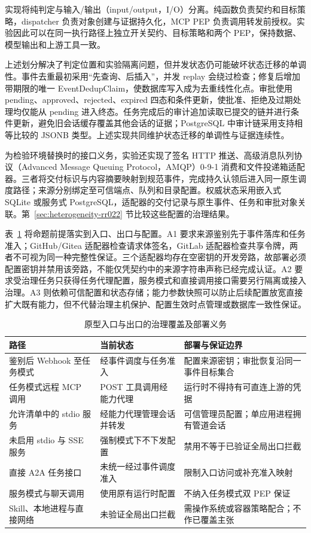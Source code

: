 实现将纯判定与输入/输出（input/output，I/O）分离。纯函数负责契约和目标策略，dispatcher 负责对象创建与证据持久化，MCP PEP 负责调用转发前授权。实验因此可以在同一执行路径上独立开关契约、目标策略和两个 PEP，保持数据、模型输出和上游工具一致。

上述划分解决了判定位置和实验隔离问题，但并发状态仍可能破坏状态迁移的单调性。事件去重最初采用“先查询、后插入”，并发 replay 会绕过检查；修复后增加带期限的唯一 EventDedupClaim，使数据库写入成为去重线性化点。审批使用 pending、approved、rejected、expired 四态和条件更新，使批准、拒绝及过期处理均仅能从 pending 进入终态。任务完成后的审计追加读取已提交的链并进行条件更新，避免旧会话缓存覆盖其他会话的证据；PostgreSQL 中审计链采用支持相等比较的 JSONB 类型。上述实现共同维护状态迁移的单调性与证据连续性。

为检验环境替换时的接口义务，实验还实现了签名 HTTP 推送、高级消息队列协议（Advanced Message Queuing Protocol，AMQP）0-9-1 消费和文件投递箱适配器。三者将交付标识与内容摘要映射到规范事件，完成持久认领后进入同一原生调度路径；来源分别绑定至可信端点、队列和目录配置。权威状态采用嵌入式 SQLite 或服务式 PostgreSQL，适配器的交付记录与原生事件、任务和审批对象关联。第~\ref{sec:heterogeneity-rr022} 节比较这些配置的治理结果。

表~\ref{tab:entry-exit-rr022} 将命题前提落实到入口、出口与配置。A1 要求来源鉴别先于事件落库和任务准入；GitHub/Gitea 适配器检查请求体签名，GitLab 适配器检查共享令牌，两者不可视为同一种完整性保证。三个适配器均存在空密钥的开发旁路，故部署必须配置密钥并禁用该旁路，不能仅凭契约中的来源字符串声称已经完成认证。A2 要求受治理任务只获得任务代理配置，服务模式和直接调用接口需要另行隔离或接入治理。A3 则依赖可信配置和状态存储；能力参数快照可以防止后续配置放宽直接扩大既有能力，但不代替治理主机保护、配置生效时点管理或数据库一致性保证。

\begin{table}[htbp]
\centering
\caption{原型入口与出口的治理覆盖及部署义务}
\label{tab:entry-exit-rr022}
\small
\begin{tabular}{p{37mm}p{44mm}p{56mm}}
\toprule
路径 & 当前状态 & 部署与保证边界 \\
\midrule
鉴别后 Webhook 至任务模式 & 经事件调度与任务准入 & 配置来源密钥；审批恢复沿同一事件目标集合 \\
任务模式远程 MCP 调用 & POST 工具调用经能力代理 & 运行时不得持有可直连上游的凭据 \\
允许清单中的 stdio 服务 & 经能力代理管理会话并转发 & 可信管理员配置；单应用进程拥有管道会话 \\
未启用 stdio 与 SSE 服务 & 强制模式下不下发配置 & 禁用不等于已验证全局出口拦截 \\
直接 A2A 任务接口 & 未统一经过事件调度准入 & 限制入口访问或补充准入映射 \\
服务模式与聊天调用 & 使用原有运行时配置 & 不纳入任务模式双 PEP 保证 \\
Skill、本地进程与直接网络 & 未验证全局出口拦截 & 需操作系统或容器策略配合；不作已覆盖主张 \\
\bottomrule
\end{tabular}
\end{table}

